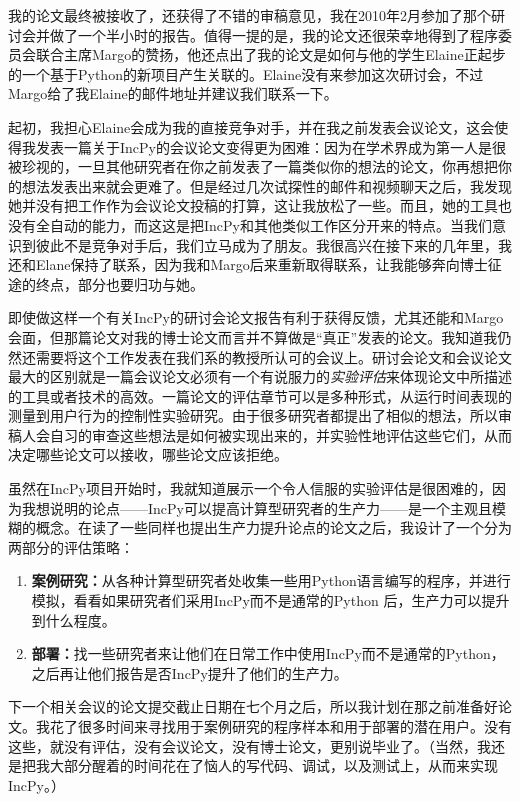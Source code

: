 \documentclass[letter,12pt]{book}
\begin{document}
\begin{CJK}{UTF8}{gbsn}
我的论文最终被接收了，还获得了不错的审稿意见，我在2010年2月参加了那个研讨会并做了一个半小时的报告。值得一提的是，我的论文还很荣幸地得到了程序委员会联合主席Margo的赞扬，他还点出了我的论文是如何与他的学生Elaine正起步的一个基于Python的新项目产生关联的。Elaine没有来参加这次研讨会，不过Margo给了我Elaine的邮件地址并建议我们联系一下。

起初，我担心Elaine会成为我的直接竞争对手，并在我之前发表会议论文，这会使得我发表一篇关于IncPy的会议论文变得更为困难：因为在学术界成为第一人是很被珍视的，一旦其他研究者在你之前发表了一篇类似你的想法的论文，你再想把你的想法发表出来就会更难了。但是经过几次试探性的邮件和视频聊天之后，我发现她并没有把工作作为会议论文投稿的打算，这让我放松了一些。而且，她的工具也没有全自动的能力，而这这是把IncPy和其他类似工作区分开来的特点。当我们意识到彼此不是竞争对手后，我们立马成为了朋友。我很高兴在接下来的几年里，我还和Elane保持了联系，因为我和Margo后来重新取得联系，让我能够奔向博士征途的终点，部分也要归功与她。

\breakline

即使做这样一个有关IncPy的研讨会论文报告有利于获得反馈，尤其还能和Margo会面，但那篇论文对我的博士论文而言并不算做是“真正”发表的论文。我知道我仍然还需要将这个工作发表在我们系的教授所认可的会议上。研讨会论文和会议论文最大的区别就是一篇会议论文必须有一个有说服力的\emph{实验评估}来体现论文中所描述的工具或者技术的高效。一篇论文的评估章节可以是多种形式，从运行时间表现的测量到用户行为的控制性实验研究。由于很多研究者都提出了相似的想法，所以审稿人会自习的审查这些想法是如何被实现出来的，并实验性地评估这些它们，从而决定哪些论文可以接收，哪些论文应该拒绝。

虽然在IncPy项目开始时，我就知道展示一个令人信服的实验评估是很困难的，因为我想说明的论点——IncPy可以提高计算型研究者的生产力——是一个主观且模糊的概念。在读了一些同样也提出生产力提升论点的论文之后，我设计了一个分为两部分的评估策略：
\begin{enumerate}
  \item \textbf{案例研究：}从各种计算型研究者处收集一些用Python语言编写的程序，并进行模拟，看看如果研究者们采用IncPy而不是通常的Python 后，生产力可以提升到什么程度。
  \item \textbf{部署：}找一些研究者来让他们在日常工作中使用IncPy而不是通常的Python，之后再让他们报告是否IncPy提升了他们的生产力。
\end{enumerate}
下一个相关会议的论文提交截止日期在七个月之后，所以我计划在那之前准备好论文。我花了很多时间来寻找用于案例研究的程序样本和用于部署的潜在用户。没有这些，就没有评估，没有会议论文，没有博士论文，更别说毕业了。（当然，我还是把我大部分醒着的时间花在了恼人的写代码、调试，以及测试上，从而来实现IncPy。）


\end{CJK}
\end{document}
